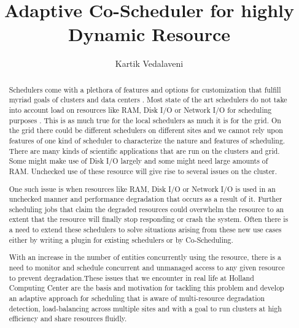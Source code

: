 \documentclass[ms,electronic,double]{nuthesis}
\begin{document}
\frontmatter
\title{Adaptive Co-Scheduler for highly Dynamic Resource}
\author{Kartik Vedalaveni}
\maketitle

\begin{abstract}
Schedulers come with a plethora of features and 
options for customization that fulfill myriad goals of  
clusters and data centers . Most state of the art schedulers do not take into account load on resources 
like RAM, Disk I/O or Network I/O for scheduling purposes \cite{pbstorque}. 
This is as much true for the local schedulers as much it is for the grid. On the 
grid there could be different schedulers on different sites and we cannot rely 
upon features of one kind of scheduler to characterize the nature and features of scheduling.
There are many kinds of scientific applications that are run on the clusters and 
grid. Some might make use of Disk I/O largely and some might need large amounts 
of RAM\cite{hccwebsite}. Unchecked use of these resource will give rise to several issues on the cluster. 

One such issue is when resources like RAM, Disk I/O or Network I/O is
used in an unchecked manner and performance degradation that occurs as a result of it. Further 
scheduling jobs that claim the degraded resources could overwhelm the resource 
to an extent that the resource will finally stop responding or crash the system\cite{hccwebsite}.
Often there is a need to extend these schedulers to solve 
situations arising from these new use cases either by writing a plugin for existing schedulers or by Co-Scheduling. 

With an increase in the number of entities concurrently using the resource, there is a 
need to monitor and schedule concurrent and unmanaged access to any given resource to prevent 
degradation.These issues that we encounter in real life at Holland Computing Center \cite{hccwebsite} are the 
basis and motivation for tackling this problem and develop an adaptive approach for scheduling 
that is aware of multi-resource degradation 
detection, load-balancing across multiple sites and  with a goal to run clusters at high efficiency and share resources fluidly.
 
  
\end{abstract}
\end{document}
